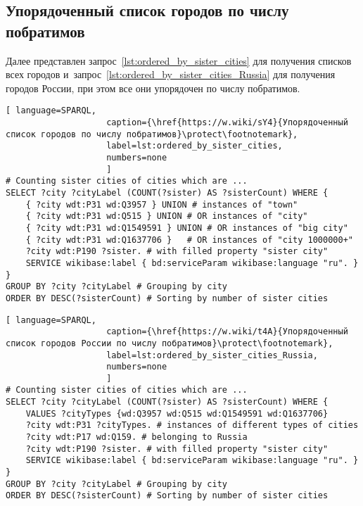 \newpage
\subsection{Упорядоченный список городов по числу побратимов}

Далее представлен запрос~\ref{lst:ordered_by_sister_cities} 
для получения списков всех городов 
и~запрос~\ref{lst:ordered_by_sister_cities_Russia} для получения городов России, 
при этом все они упорядочен по числу побратимов.

\begin{lstlisting}[ language=SPARQL, 
                    caption={\href{https://w.wiki/sY4}{Упорядоченный список городов по числу побратимов}\protect\footnotemark},
                    label=lst:ordered_by_sister_cities,
                    numbers=none
                    ]
# Counting sister cities of cities which are ...
SELECT ?city ?cityLabel (COUNT(?sister) AS ?sisterCount) WHERE {           
	{ ?city wdt:P31 wd:Q3957 } UNION # instances of "town"
	{ ?city wdt:P31 wd:Q515 } UNION # OR instances of "city"
	{ ?city wdt:P31 wd:Q1549591 } UNION # OR instances of "big city"
	{ ?city wdt:P31 wd:Q1637706 }	# OR instances of "city 1000000+"
	?city wdt:P190 ?sister. # with filled property "sister city"
	SERVICE wikibase:label { bd:serviceParam wikibase:language "ru". }
}
GROUP BY ?city ?cityLabel # Grouping by city                                   
ORDER BY DESC(?sisterCount) # Sorting by number of sister cities
\end{lstlisting}

\begin{lstlisting}[ language=SPARQL, 
                    caption={\href{https://w.wiki/t4A}{Упорядоченный список городов России по числу побратимов}\protect\footnotemark},
                    label=lst:ordered_by_sister_cities_Russia,
                    numbers=none
                    ]
# Counting sister cities of cities which are ...
SELECT ?city ?cityLabel (COUNT(?sister) AS ?sisterCount) WHERE {           
	VALUES ?cityTypes {wd:Q3957 wd:Q515 wd:Q1549591 wd:Q1637706}
	?city wdt:P31 ?cityTypes. # instances of different types of cities
	?city wdt:P17 wd:Q159. # belonging to Russia
	?city wdt:P190 ?sister. # with filled property "sister city"
	SERVICE wikibase:label { bd:serviceParam wikibase:language "ru". }
}
GROUP BY ?city ?cityLabel # Grouping by city
ORDER BY DESC(?sisterCount) # Sorting by number of sister cities
\end{lstlisting}

